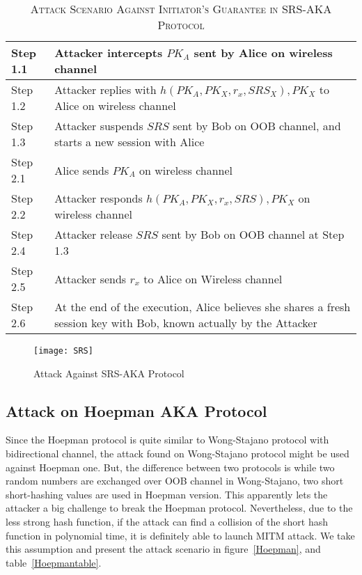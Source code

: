 \begin{table}[t]
\centering
\caption{\textsc{Attack Scenario Against Initiator's Guarantee in SRS-AKA Protocol}}
\label{SRSattacktable}
{\small
\begin{tabular}{| l | p{11cm} |}
 \hline
 Step 1.1 & Attacker intercepts $PK_A$ sent by Alice on wireless channel\\ \hline
 Step 1.2 & Attacker replies with $h(PK_A,PK_X,r_x,SRS_X), PK_X$ to Alice on wireless channel\\ \hline
 Step 1.3 & Attacker suspends $SRS$ sent by Bob on OOB channel, and starts a new session with Alice\\ \hline \hline
 Step 2.1 & Alice sends $PK_A$ on wireless channel\\ \hline
 Step 2.2 & Attacker responds $h(PK_A,PK_X,r_x,SRS), PK_X$  on wireless channel\\ \hline
 Step 2.4 & Attacker release $SRS$ sent by Bob on OOB channel at Step 1.3\\ \hline
 Step 2.5 & Attacker sends $r_x$ to Alice on Wireless channel\\ \hline
 Step 2.6 & At the end of the execution, Alice believes she shares a fresh session key with Bob, known actually by the Attacker\\ \hline
\end{tabular}
}
\end{table}

\begin{figure}
  \centering
  \texttt{[image: SRS]}
  \caption{Attack Against SRS-AKA Protocol}
  \label{SRSattack}
\end{figure}


\subsection{Attack on Hoepman AKA Protocol}

Since the Hoepman protocol is quite similar to Wong-Stajano protocol with bidirectional channel, the attack found on Wong-Stajano protocol might be used against Hoepman one. But, the difference between two protocols is while two random numbers are exchanged over OOB channel in Wong-Stajano, two short short-hashing values are used in Hoepman version. This apparently lets the attacker a big challenge to break the Hoepman protocol. Nevertheless, due to the less strong hash function, if the attack can find a collision of the short hash function in polynomial time, it is definitely able to launch MITM attack. We take this assumption and present the attack scenario in figure~\ref{Hoepman}, and table~\ref{Hoepmantable}. 
   
